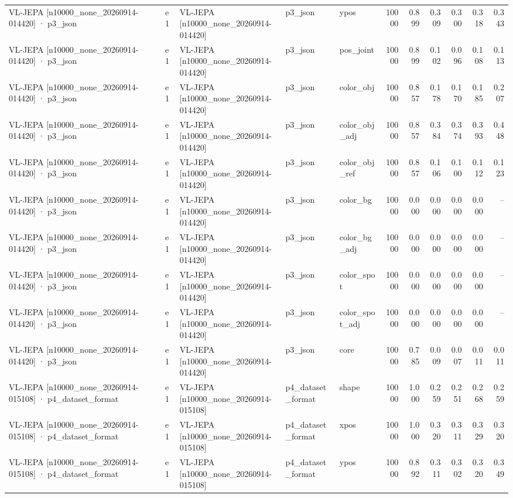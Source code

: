 \begin{tabular}{lllllrrrrrr}
VL-JEPA [n10000\_none\_20260914-014420] · p3\_json & e1 & VL-JEPA [n10000\_none\_20260914-014420] & p3\_json & ypos & 10000 & 0.899 & 0.309 & 0.300 & 0.318 & 0.343 \\
VL-JEPA [n10000\_none\_20260914-014420] · p3\_json & e1 & VL-JEPA [n10000\_none\_20260914-014420] & p3\_json & pos\_joint & 10000 & 0.899 & 0.102 & 0.096 & 0.108 & 0.113 \\
VL-JEPA [n10000\_none\_20260914-014420] · p3\_json & e1 & VL-JEPA [n10000\_none\_20260914-014420] & p3\_json & color\_obj & 10000 & 0.857 & 0.178 & 0.170 & 0.185 & 0.207 \\
VL-JEPA [n10000\_none\_20260914-014420] · p3\_json & e1 & VL-JEPA [n10000\_none\_20260914-014420] & p3\_json & color\_obj\_adj & 10000 & 0.857 & 0.384 & 0.374 & 0.393 & 0.448 \\
VL-JEPA [n10000\_none\_20260914-014420] · p3\_json & e1 & VL-JEPA [n10000\_none\_20260914-014420] & p3\_json & color\_obj\_ref & 10000 & 0.857 & 0.106 & 0.100 & 0.112 & 0.123 \\
VL-JEPA [n10000\_none\_20260914-014420] · p3\_json & e1 & VL-JEPA [n10000\_none\_20260914-014420] & p3\_json & color\_bg & 10000 & 0.000 & 0.000 & 0.000 & 0.000 & -- \\
VL-JEPA [n10000\_none\_20260914-014420] · p3\_json & e1 & VL-JEPA [n10000\_none\_20260914-014420] & p3\_json & color\_bg\_adj & 10000 & 0.000 & 0.000 & 0.000 & 0.000 & -- \\
VL-JEPA [n10000\_none\_20260914-014420] · p3\_json & e1 & VL-JEPA [n10000\_none\_20260914-014420] & p3\_json & color\_spot & 10000 & 0.000 & 0.000 & 0.000 & 0.000 & -- \\
VL-JEPA [n10000\_none\_20260914-014420] · p3\_json & e1 & VL-JEPA [n10000\_none\_20260914-014420] & p3\_json & color\_spot\_adj & 10000 & 0.000 & 0.000 & 0.000 & 0.000 & -- \\
VL-JEPA [n10000\_none\_20260914-014420] · p3\_json & e1 & VL-JEPA [n10000\_none\_20260914-014420] & p3\_json & core & 10000 & 0.785 & 0.009 & 0.007 & 0.011 & 0.011 \\
VL-JEPA [n10000\_none\_20260914-015108] · p4\_dataset\_format & e1 & VL-JEPA [n10000\_none\_20260914-015108] & p4\_dataset\_format & shape & 10000 & 1.000 & 0.259 & 0.251 & 0.268 & 0.259 \\
VL-JEPA [n10000\_none\_20260914-015108] · p4\_dataset\_format & e1 & VL-JEPA [n10000\_none\_20260914-015108] & p4\_dataset\_format & xpos & 10000 & 1.000 & 0.320 & 0.311 & 0.329 & 0.320 \\
VL-JEPA [n10000\_none\_20260914-015108] · p4\_dataset\_format & e1 & VL-JEPA [n10000\_none\_20260914-015108] & p4\_dataset\_format & ypos & 10000 & 0.892 & 0.311 & 0.302 & 0.320 & 0.349 \\

\end{tabular}
